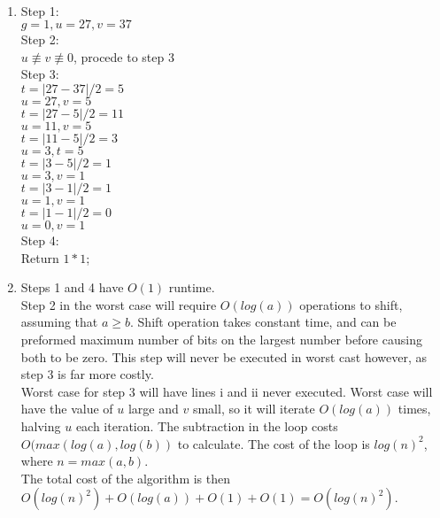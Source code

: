 \documentclass{assignment}
\begin{document}
\begin{problemlist}
\clearpage
\pbitem
\begin{problem}
\end{problem}
\begin{answer}
  \\
  \begin{enumerate}
  \item
    Step 1:\\
    $g = 1, u=27, v=37$\\
    Step 2:\\
    $u \not\equiv v \not\equiv 0$, procede to step 3\\
    Step 3:\\
    $t = |27 - 37|/2 = 5$\\
    $u = 27, v = 5$\\
    $t = |27 - 5| / 2 = 11$\\
    $u = 11, v = 5$\\
    $t = |11-5|/2 = 3$\\
    $u = 3, t = 5$\\
    $t = |3-5|/2 = 1$\\
    $u = 3, v = 1$\\
    $t = |3-1|/2 = 1$\\
    $u = 1, v = 1$\\
    $t = |1-1|/2 = 0$\\
    $u = 0, v = 1$\\
    Step 4:\\
    Return $1 * 1$;
  \item
    Steps 1 and 4 have $O(1)$ runtime.\\
    Step 2 in the worst case will require $O(log(a))$ operations to shift, assuming that $a \ge b$. Shift operation takes constant time, and can be preformed maximum number of bits on the largest number before causing both to be zero. This step will never be executed in worst cast however, as step 3 is far more costly.\\
    Worst case for step 3 will have lines i and ii never executed. Worst case will have the value of $u$ large and $v$ small, so it will iterate $O(log(a))$ times, halving $u$ each iteration. The subtraction in the loop costs $O(max(log(a),log(b))$ to calculate. The cost of the loop is $log(n)^2$, where $n =max(a,b)$.\\
    The total cost of the algorithm is then $O(log(n)^2) + O(log(a)) + O(1) + O(1)=O(log(n)^2)$.\\
  \end{enumerate}
\end{answer}


\end{problemlist}
\end{document}
